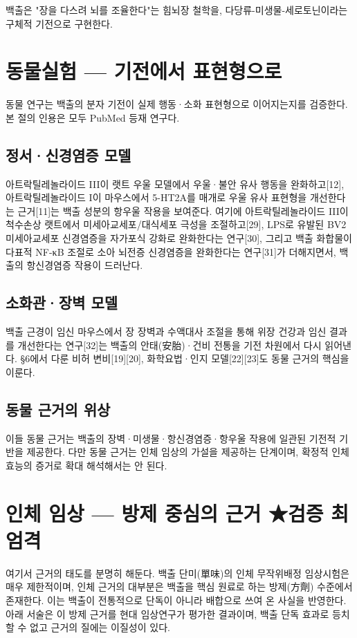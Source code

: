 \documentclass[12pt,oneside]{book}
\begin{document}
백출은 "장을 다스려 뇌를 조율한다"는 힘뇌장 철학을, 다당류-미생물-세로토닌이라는 구체적 기전으로 구현한다.

\section{동물실험 — 기전에서 표현형으로}

동물 연구는 백출의 분자 기전이 실제 행동·소화 표현형으로 이어지는지를 검증한다. 본 절의 인용은 모두 PubMed 등재 연구다.

\subsection{정서·신경염증 모델}

아트락틸레놀라이드 III이 랫트 우울 모델에서 우울·불안 유사 행동을 완화하고[12], 아트락틸레놀라이드 I이 마우스에서 5-HT2A를 매개로 우울 유사 표현형을 개선한다는 근거[11]는 백출 성분의 항우울 작용을 보여준다. 여기에 아트락틸레놀라이드 III이 척수손상 랫트에서 미세아교세포/대식세포 극성을 조절하고[29], LPS로 유발된 BV2 미세아교세포 신경염증을 자가포식 강화로 완화한다는 연구[30], 그리고 백출 화합물이 다표적 NF-κB 조절로 소아 뇌전증 신경염증을 완화한다는 연구[31]가 더해지면서, 백출의 항신경염증 작용이 드러난다.

\subsection{소화관·장벽 모델}

백출 근경이 임신 마우스에서 장 장벽과 수액대사 조절을 통해 위장 건강과 임신 결과를 개선한다는 연구[32]는 백출의 안태(安胎)·건비 전통을 기전 차원에서 다시 읽어낸다. §6에서 다룬 비허 변비[19][20], 화학요법·인지 모델[22][23]도 동물 근거의 핵심을 이룬다.

\subsection{동물 근거의 위상}

이들 동물 근거는 백출의 장벽·미생물·항신경염증·항우울 작용에 일관된 기전적 기반을 제공한다. 다만 동물 근거는 인체 임상의 가설을 제공하는 단계이며, 확정적 인체 효능의 증거로 확대 해석해서는 안 된다.

\section{인체 임상 — 방제 중심의 근거 ★검증 최엄격}

여기서 근거의 태도를 분명히 해둔다. 백출 단미(單味)의 인체 무작위배정 임상시험은 매우 제한적이며, 인체 근거의 대부분은 백출을 핵심 원료로 하는 방제(方劑) 수준에서 존재한다. 이는 백출이 전통적으로 단독이 아니라 배합으로 쓰여 온 사실을 반영한다. 아래 서술은 이 방제 근거를 현대 임상연구가 평가한 결과이며, 백출 단독 효과로 등치할 수 없고 근거의 질에는 이질성이 있다.
\end{document}
